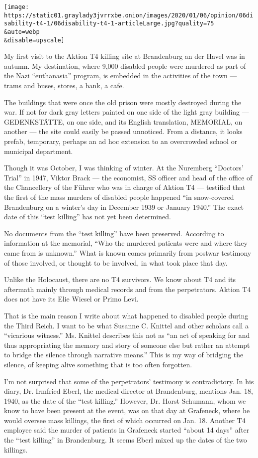 \texttt{[image: https://static01.graylady3jvrrxbe.onion/images/2020/01/06/opinion/06disability-t4-1/06disability-t4-1-articleLarge.jpg?quality=75\\\&auto=webp\\\&disable=upscale]}

My first visit to the Aktion T4 killing site at Brandenburg an der Havel
was in autumn. My destination, where 9,000 disabled people were murdered
as part of the Nazi ``euthanasia'' program, is embedded in the
activities of the town --- trams and buses, stores, a bank, a cafe.

The buildings that were once the old prison were mostly destroyed during
the war. If not for dark gray letters painted on one side of the light
gray building --- GEDENKSTÄTTE, on one side, and its English
translation, MEMORIAL, on another --- the site could easily be passed
unnoticed. From a distance, it looks prefab, temporary, perhaps an ad
hoc extension to an overcrowded school or municipal department.

Though it was October, I was thinking of winter. At the Nuremberg
``Doctors' Trial'' in 1947, Viktor Brack --- the economist, SS officer
and head of the office of the Chancellery of the Führer who was in
charge of Aktion T4 --- testified that the first of the mass murders of
disabled people happened ``in snow-covered Brandenburg on a winter's day
in December 1939 or January 1940.'' The exact date of this ``test
killing'' has not yet been determined.

No documents from the ``test killing'' have been preserved. According to
information at the memorial, ``Who the murdered patients were and where
they came from is unknown.'' What is known comes primarily from postwar
testimony of those involved, or thought to be involved, in what took
place that day.

Unlike the Holocaust, there are no T4 survivors. We know about T4 and
its aftermath mainly through medical records and from the perpetrators.
Aktion T4 does not have its Elie Wiesel or Primo Levi.

That is the main reason I write about what happened to disabled people
during the Third Reich. I want to be what Susanne C. Knittel and other
scholars call a ``vicarious witness.'' Ms. Knittel describes this not as
``an act of speaking for and thus appropriating the memory and story of
someone else but rather an attempt to bridge the silence through
narrative means.'' This is my way of bridging the silence, of keeping
alive something that is too often forgotten.

I'm not surprised that some of the perpetrators' testimony is
contradictory. In his diary, Dr. Irmfried Eberl, the medical director at
Brandenburg, mentions Jan. 18, 1940, as the date of the ``test
killing.'' However, Dr. Horst Schumann, whom we know to have been
present at the event, was on that day at Grafeneck, where he would
oversee mass killings, the first of which occurred on Jan. 18. Another
T4 employee said the murder of patients in Grafeneck started ``about 14
days'' after the ``test killing'' in Brandenburg. It seems Eberl mixed
up the dates of the two killings.

